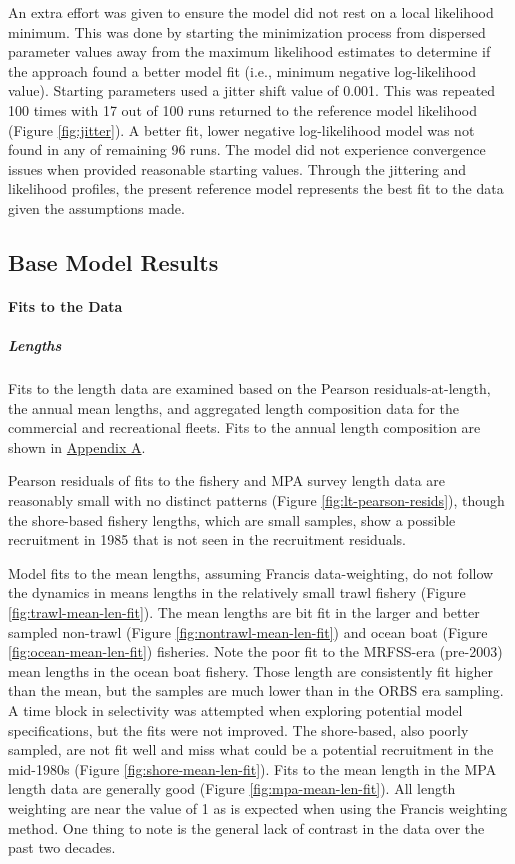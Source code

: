 \documentclass[11pt,
  english,
  letterpaper,
]{article}
\begin{document}
An extra effort was given to ensure the model did not rest on a local likelihood minimum. This was done by starting the minimization process from dispersed parameter values away from the maximum likelihood estimates to determine if the approach found a better model fit (i.e., minimum negative log-likelihood value). Starting parameters used a jitter shift value of 0.001. This was repeated 100 times with 17 out of 100 runs returned to the reference model likelihood (Figure \ref{fig:jitter}). A better fit, lower negative log-likelihood model was not found in any of remaining 96 runs. The model did not experience convergence issues when provided reasonable starting values. Through the jittering and likelihood profiles, the present reference model represents the best fit to the data given the assumptions made.

\hypertarget{base-model-results}{%
\subsection{Base Model Results}\label{base-model-results}}

\hypertarget{fits-to-the-data}{%
\paragraph{Fits to the Data}\label{fits-to-the-data}}

\hypertarget{lengths}{%
\subparagraph{Lengths}\label{lengths}}

Fits to the length data are examined based on the Pearson residuals-at-length, the annual mean lengths, and aggregated length composition data for the commercial and recreational fleets. Fits to the annual length composition are shown in \protect\hyperlink{app_a}{Appendix A}.

Pearson residuals of fits to the fishery and MPA survey length data are reasonably small with no distinct patterns (Figure \ref{fig:lt-pearson-resids}), though the shore-based fishery lengths, which are small samples, show a possible recruitment in 1985 that is not seen in the recruitment residuals.

Model fits to the mean lengths, assuming Francis data-weighting, do not follow the dynamics in means lengths in the relatively small trawl fishery (Figure \ref{fig:trawl-mean-len-fit}). The mean lengths are bit fit in the larger and better sampled non-trawl (Figure \ref{fig:nontrawl-mean-len-fit}) and ocean boat (Figure \ref{fig:ocean-mean-len-fit}) fisheries. Note the poor fit to the MRFSS-era (pre-2003) mean lengths in the ocean boat fishery. Those length are consistently fit higher than the mean, but the samples are much lower than in the ORBS era sampling. A time block in selectivity was attempted when exploring potential model specifications, but the fits were not improved. The shore-based, also poorly sampled, are not fit well and miss what could be a potential recruitment in the mid-1980s (Figure \ref{fig:shore-mean-len-fit}). Fits to the mean length in the MPA length data are generally good (Figure \ref{fig:mpa-mean-len-fit}). All length weighting are near the value of 1 as is expected when using the Francis weighting method. One thing to note is the general lack of contrast in the data over the past two decades.
\end{document}
